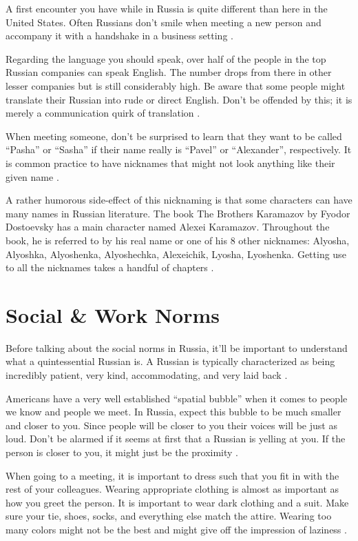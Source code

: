 \documentclass[11pt,a4paper,twoside]{report}
\begin{document}
A first encounter you have while in Russia is quite different than here in the
United States. Often Russians don’t smile when meeting a new person and
accompany it with a handshake in a business setting \citep*[pg.
158]{cultureSmart}.

Regarding the language you should speak, over half of the people in the top
Russian companies can speak English. The number drops from there in other
lesser companies but is still considerably high. Be aware that some people
might translate their Russian into rude or direct English. Don’t be offended by
this; it is merely a communication quirk of translation \citep*[pg.
158]{cultureSmart}.

When meeting someone, don’t be surprised to learn that they want to be called
“Pasha” or “Sasha” if their name really is “Pavel” or “Alexander”,
respectively. It is common practice to have nicknames that might not look
anything like their given name \citep{personalExperiences}.

A rather humorous side-effect of this nicknaming is that some characters can
have many names in Russian literature. The book The Brothers Karamazov by
Fyodor Dostoevsky has a main character named Alexei Karamazov. Throughout the
book, he is referred to by his real name or one of his 8 other nicknames:
Alyosha, Alyoshka, Alyoshenka, Alyoshechka, Alexeichik, Lyosha, Lyoshenka.
Getting use to all the nicknames takes a handful of chapters
\citep*{karamazov}.

\section{Social \& Work Norms}

Before talking about the social norms in Russia, it’ll be important to
understand what a quintessential Russian is. A Russian is typically
characterized as being incredibly patient, very kind, accommodating,
and very laid back \citep*[pg. 70]{cultureSmart}.

Americans have a very well established “spatial bubble” when it comes to people
we know and people we meet. In Russia, expect this bubble to be much smaller
and closer to you. Since people will be closer to you their voices will be just
as loud. Don’t be alarmed if it seems at first that a Russian is yelling at
you. If the person is closer to you, it might just be the proximity
\citep*[pg. 84]{cultureSmart}.

When going to a meeting,  it is important to dress such that you fit in with
the rest of your colleagues. Wearing appropriate clothing is almost as
important as how you greet the person. It is important to wear dark clothing
and a suit. Make sure your tie, shoes, socks, and everything else match the
attire. Wearing too many colors might not be the best and might give off the
impression of laziness \citep*[pg. 148]{cultureSmart}.
\end{document}

